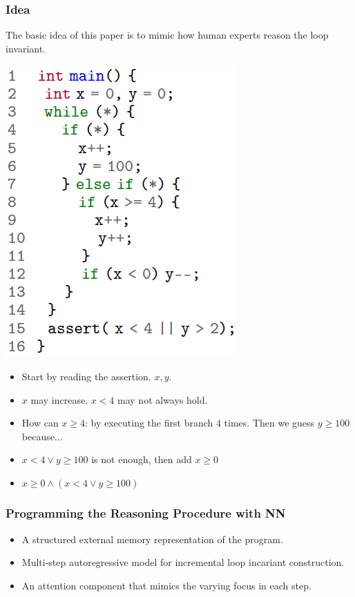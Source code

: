 \documentclass[11pt]{beamer}
\begin{document}
\begin{frame}\frametitle{Idea}
The basic idea of this paper is to mimic how human experts reason the loop invariant.

\begin{example}
\begin{multicols}{2}
\includegraphics[scale = 0.45]{1.png}

\begin{itemize}
\item Start by reading the assertion. $x, y$.
\item $x$ may increase. $x < 4$ may not always hold.
\item How can $x \ge 4$: by executing the first branch $4$ times. Then we guess $y \ge 100$ because...
\item $x < 4 \vee y \ge 100$ is not enough, then add $x \ge 0$
\item $x \ge 0 \wedge (x < 4 \vee y \ge 100)$

\end{itemize}
\end{multicols}
\end{example}
\end{frame}

\begin{frame}\frametitle{Programming the Reasoning Procedure with NN}
\begin{itemize}
\item A structured external memory representation of the program.
\item Multi-step autoregressive model for incremental loop incariant construction.
\item An attention component that mimics the varying focus in each step.

\end{itemize}

\end{frame}
\end{document}
